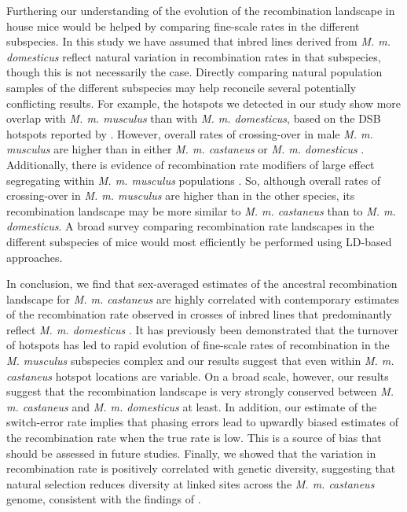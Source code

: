 	Furthering our understanding of the evolution of the recombination landscape in house mice would be helped by comparing fine-scale rates in the different subspecies. In this study we have assumed that inbred lines derived from \textit{M. m. domesticus} reflect natural variation in recombination rates in that subspecies, though this is not necessarily the case. Directly comparing natural population samples of the different subspecies may help reconcile several potentially conflicting results. For example, the hotspots we detected in our study show more overlap with \textit{M. m. musculus} than with \textit{M. m. domesticus}, based on the DSB hotspots reported by \cite{RN249}. However, overall rates of crossing-over in male \textit{M. m. musculus} are higher than in either \textit{M. m. castaneus} or \textit{M. m. domesticus} \citep{RN270}. Additionally, there is evidence of recombination rate modifiers of large effect segregating within \textit{M. m. musculus} populations \citep{RN244}. So, although overall rates of crossing-over in \textit{M. m. musculus} are higher than in the other species, its recombination landscape may be more similar to \textit{M. m. castaneus} than to \textit{M. m. domesticus}. A broad survey comparing recombination rate landscapes in the different subspecies of mice would most efficiently be performed using LD-based approaches.  

In conclusion, we find that sex-averaged estimates of the ancestral recombination landscape for \textit{M. m. castaneus} are highly correlated with contemporary estimates of the recombination rate observed in crosses of inbred lines that predominantly reflect \textit{M. m. domesticus} \citep{RN232}. It has previously been demonstrated that the turnover of hotspots has led to rapid evolution of fine-scale rates of recombination in the \textit{M. musculus} subspecies complex \citep{RN249} and our results suggest that even within \textit{M. m. castaneus} hotspot locations are variable. On a broad scale, however, our results suggest that the recombination landscape is very strongly conserved between \textit{M. m. castaneus} and \textit{M. m. domesticus} at least. In addition, our estimate of the switch-error rate implies that phasing errors lead to upwardly biased estimates of the recombination rate when the true rate is low. This is a source of bias that should be assessed in future studies. Finally, we showed that the variation in recombination rate is positively correlated with genetic diversity, suggesting that natural selection reduces diversity at linked sites across the \textit{M. m. castaneus} genome, consistent with the findings of \cite{RN122}. 
  